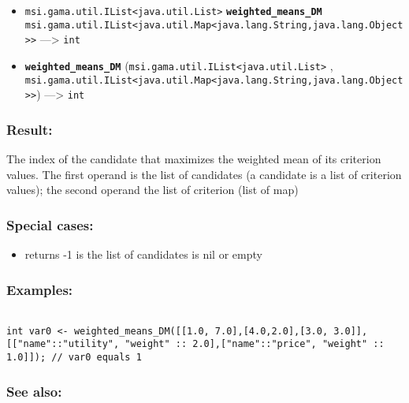 \documentclass[]{book}
\providecommand{\tightlist}{%
  \setlength{\itemsep}{0pt}\setlength{\parskip}{0pt}}
\theoremstyle{definition}
\theoremstyle{definition}
\theoremstyle{definition}
\theoremstyle{remark}
\begin{document}
\begin{itemize}
\tightlist
\item
  \texttt{msi.gama.util.IList\textless{}java.util.List\textgreater{}}
  \textbf{\texttt{weighted\_means\_DM}}
  \texttt{msi.gama.util.IList\textless{}java.util.Map\textless{}java.lang.String,java.lang.Object\textgreater{}\textgreater{}}
  ---\textgreater{} \texttt{int}
\item
  \textbf{\texttt{weighted\_means\_DM}}
  (\texttt{msi.gama.util.IList\textless{}java.util.List\textgreater{}} ,
  \texttt{msi.gama.util.IList\textless{}java.util.Map\textless{}java.lang.String,java.lang.Object\textgreater{}\textgreater{}})
  ---\textgreater{} \texttt{int}
\end{itemize}

\subsubsection{Result:}\label{result-533}

The index of the candidate that maximizes the weighted mean of its
criterion values. The first operand is the list of candidates (a
candidate is a list of criterion values); the second operand the list of
criterion (list of map)

\subsubsection{Special cases:}\label{special-cases-145}

\begin{itemize}
\tightlist
\item
  returns -1 is the list of candidates is nil or empty
\end{itemize}

\subsubsection{Examples:}\label{examples-381}

\begin{verbatim}
 
int var0 <- weighted_means_DM([[1.0, 7.0],[4.0,2.0],[3.0, 3.0]], [["name"::"utility", "weight" :: 2.0],["name"::"price", "weight" :: 1.0]]); // var0 equals 1
\end{verbatim}

\subsubsection{See also:}\label{see-also-219}
\end{document}
